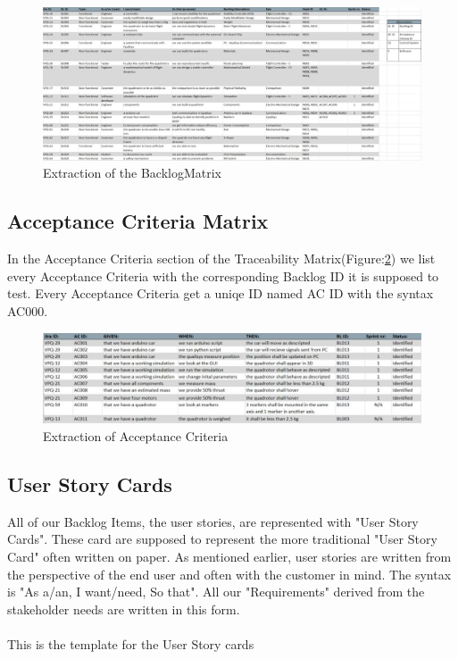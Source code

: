 \begin{figure}[h]
    \centering
        \includegraphics[width = 1\textwidth]{VAPIQ-PICTURES/BacklogMatrix}
    \caption{Extraction of the BacklogMatrix}
    \label{fig:backlog}
\end{figure}

\newpage

\subsection{Acceptance Criteria Matrix}
In the Acceptance Criteria section of the Traceability Matrix(Figure:\ref{fig:acm}) we list every Acceptance Criteria with the corresponding Backlog ID it is supposed to test. Every Acceptance Criteria get a uniqe ID named AC ID with the syntax AC000. 
\begin{figure}[h]
    \centering
        \includegraphics[width = 1\textwidth]{VAPIQ-PICTURES/AC}
    \caption{Extraction of Acceptance Criteria}
    \label{fig:acm}
\end{figure}

\newpage

\subsection{User Story Cards}
All of our Backlog Items, the user stories, are represented with "User Story Cards". These card are supposed to represent the more traditional "User Story Card" often written on paper. As mentioned earlier, user stories are written from the perspective of the end user and often with the customer in mind. The syntax is "As a/an, I want/need, So that". All our "Requirements" derived from the stakeholder needs are written in this form. \\ 
\\
This is the template for the User Story cards 


